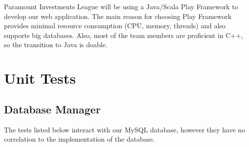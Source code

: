 Paramount Investments League will be using a Java/Scala Play Framework to
develop our web application. The main reason for choosing Play Framework
provides minimal resource consumption (CPU, memory, threads) and also supports
big databases. Also, most of the team members are proficient in C++, so the
transition to Java is doable.\\

\section{Unit Tests}

\subsection{Database Manager}
 The tests listed below interact with our MySQL database, however they have no
 correlation to the implementation of the database.\\

